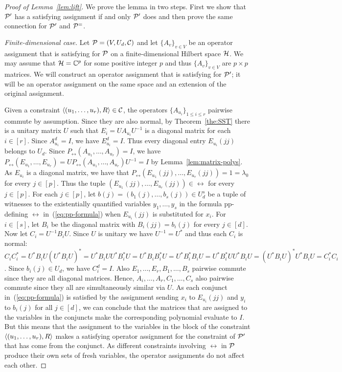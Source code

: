 %
\begin{proof}[Proof of Lemma~\ref{lem:lift}] 
We prove the lemma in two steps. First we show that ${\mathcal P}'$ has a satisfying assignment if and only ${\mathcal P}'$ does and then prove the same connection for ${\mathcal P}'$ and ${\mathcal P}^=$. 

{\it Finite-dimensional case.}
Let ${\mathcal P}=(V,U_d,{\mathcal C})$ and let $\{A_v\}_{v\in V}$ be an
  operator assignment that is satisfying for ${\mathcal P}$ on a finite-dimensional
  Hilbert space ${\mathcal H}$. We may assume that ${\mathcal H}={\mathbb C}^p$ for some positive integer
  $p$
  and thus $\{A_v\}_{v\in V}$ are $p\times p$ matrices. We will
  construct an operator assignment that is satisfying for ${\mathcal P}'$; it will be an
  operator assignment on the same space and an extension of the original
  assignment.
 
  Given a constraint $\langle (u_1,\ldots,u_r),R \rangle\in{\mathcal C}$, the operators
  $\{A_{u_i}\}_{1\leq i\leq r}$ pairwise commute by assumption. Since they are
  also normal, by Theorem~\ref{the:SST} there is a unitary matrix $U$ such that
  $E_i=UA_{u_i}U^{-1}$ is a diagonal matrix for each $i\in [r]$. Since $A_{u_i}^d=I$,
  we have $E_{u_i}^d=I$. Thus every diagonal entry $E_{u_i}(jj)$ belongs to
  $U_d$. Since $P_\rel(A_{u_1},\ldots,A_{u_r})=I$, we have $P_\rel(E_{u_1},\ldots,E_{u_r})=UP_\rel(A_{u_1},\ldots,A_{u_r})U^{-1}=I$ by Lemma~\ref{lem:matrix-polys}. As
  $E_{u_i}$ is a diagonal matrix, we have that
  $P_\rel(E_{u_1}(jj),\ldots,E_{u_r}(jj))=1=\lambda_0$ for every $j\in [p]$.
  Thus the tuple $(E_{u_1}(jj),\ldots,E_{u_r}(jj))\in\rel$ for every $j\in [p]$. 
  For each $j\in [p]$, let $b(j)=(b_1(j),\ldots,b_s(j))\in U_d^s$ be a tuple of
  witnesses to the existentially quantified variables $y_1,\ldots,y_s$ in the
  formula pp-defining $\rel$ in~(\ref{eq:pp-formula}) when $E_{u_i}(jj)$ is
  substituted for $x_i$. For $i\in [s]$, let $B_i$ be the diagonal matrix with
  $B_i(jj)=b_i(j)$ for every $j\in [d]$. Now let $C_i=U^{-1}B_iU$. Since $U$ is
  unitary we have $U^{-1}=U^*$ and thus each $C_i$ is 
  normal:
  $C_iC_i^*=U^*B_iU(U^*B_iU)^*=U^*B_iUU^*B_i^*U
  =U^*B_iB_i^*U
  =U^*B_i^*B_iU
  =U^*B_i^*UU^*B_iU
  =(U^*B_iU)^*U^*B_iU=C_i^*C_i$.
  Since $b_i(j)\in U_d$, we have $C_i^d=I$. Also
  $E_1,\ldots,E_r,B_1,\ldots,B_s$ pairwise commute since they are all diagonal
  matrices. Hence, $A_i,\ldots,A_r,C_1,\ldots,C_s$ also pairwise commute since
  they all are simultaneously similar via $U$.
  As each conjunct in~(\ref{eq:pp-formula}) is satisfied by the assignment
  sending $x_i$ to $E_{u_i}(jj)$ and $y_i$ to $b_i(j)$ for all $j\in [d]$, we
  can conclude that the matrices that are assigned to the variables in the
  conjuncts make the corresponding polynomial evaluate to $I$. But
  this means that the assignment to the variables in the block of the constraint
  $\langle (u_1,\ldots,u_r),R \rangle$ makes a satisfying operator assignment for the
  constraint of ${\mathcal P}'$ that has come from the conjunct. As different constraints involving $\rel$ in ${\mathcal P}$
  produce their own sets of fresh variables, the operator assignments do not
  affect each other.


\end{proof}
